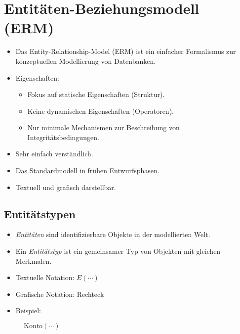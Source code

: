     \section{Entitäten-Beziehungsmodell (ERM)} %
        \begin{itemize}
        	\item Das Entity-Relationship-Model (ERM) ist ein einfacher Formalismus zur konzeptuellen Modellierung von Datenbanken.
        	\item Eigenschaften:
        		\begin{itemize}
        			\item Fokus auf statische Eigenschaften (Struktur).
        			\item Keine dynamischen Eigenschaften (Operatoren).
        			\item Nur minimale Mechanismen zur Beschreibung von Integritätsbedingungen.
        		\end{itemize}
        	\item Sehr einfach verständlich.
        	\item Das Standardmodell in frühen Entwurfsphasen.
        	\item Textuell und grafisch darstellbar.
        \end{itemize}

        \subsection{Entitätstypen} %
            \begin{itemize}
            	\item \textit{Entitäten} sind identifizierbare Objekte in der modellierten Welt.
            	\item Ein \textit{Entitätstyp} ist ein gemeinsamer Typ von Objekten mit gleichen Merkmalen.
            	\item Textuelle Notation: \(E(\cdots)\)
            	\item Grafische Notation: Rechteck
            	\item Beispiel:
            \end{itemize}
        	\begin{figure}[H]
        		\centering
        		
        		\( \text{Konto}(\cdots) \)
        		
        		\vspace{1cm}
        		
        	\end{figure}

